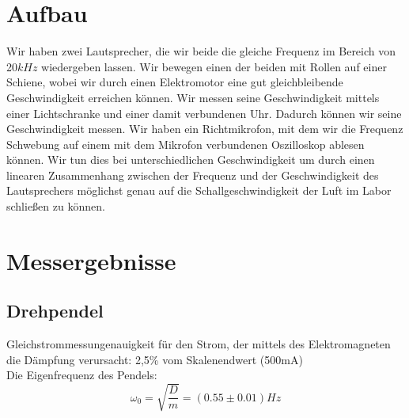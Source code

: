 \documentclass{article}
\begin{document}
\section{Aufbau}
Wir haben zwei Lautsprecher, die wir beide die gleiche Frequenz im Bereich von 20$\si{kHz}$ wiedergeben lassen. Wir bewegen einen der beiden mit Rollen auf einer Schiene, wobei wir durch einen Elektromotor eine gut gleichbleibende Geschwindigkeit erreichen können. Wir messen seine Geschwindigkeit mittels einer Lichtschranke und einer damit verbundenen Uhr. Dadurch können wir seine Geschwindigkeit messen. Wir haben ein Richtmikrofon, mit dem wir die Frequenz Schwebung auf einem mit dem Mikrofon verbundenen Oszilloskop ablesen können. Wir tun dies bei unterschiedlichen Geschwindigkeit um durch einen linearen Zusammenhang zwischen der Frequenz und der Geschwindigkeit des Lautsprechers möglichst genau auf die Schallgeschwindigkeit der Luft im Labor schließen zu können.
\section{Messergebnisse}

\subsection{Drehpendel}

Gleichstrommessungenauigkeit für den Strom, der mittels des Elektromagneten die Dämpfung verursacht: 2,5\% vom Skalenendwert (500mA)\\
Die Eigenfrequenz des Pendels:
$$\omega_0=\sqrt{\frac{D}{m}}=(0.55 \pm 0.01)\si{Hz}$$
\\
\end{document}
